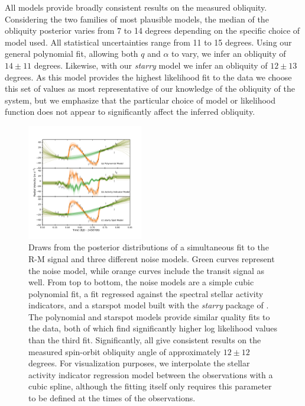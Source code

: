 \documentclass[twocolumn]{aastex63}
\begin{document}
All models provide broadly consistent results on the measured obliquity. Considering the two families of most plausible models, the median of the obliquity posterior varies from 7 to 14 degrees depending on the specific choice of model used.
All statistical uncertainties range from 11 to 15 degrees.
Using our general polynomial fit, allowing both $q$ and $\alpha$ to vary, we infer an obliquity of $14 \pm 11$ degrees.
Likewise, with our \textit{starry} model we infer an obliquity of $12 \pm 13$ degrees.
As this model provides the highest likelihood fit to the data we choose this set of values as most representative of our knowledge of the obliquity of the system, but we emphasize that the particular choice of model or likelihood function does not appear to significantly affect the inferred obliquity. 






\begin{figure}[!tbh]
  \begin{center}
    \includegraphics[width=0.45\textwidth, trim={0cm 0.0cm 1cm 1cm}, clip=true]{../figures/model_comp.pdf}
   \end{center}
  \caption{Draws from the posterior distributions of a simultaneous fit to the
  R-M signal and three different noise models. Green curves represent the noise model, while orange curves include the transit signal as well. From top to bottom, the noise models are a simple cubic polynomial fit, a fit regressed against the spectral stellar activity indicators, and a starspot model built with the \textit{starry} package of \citep{Luger19}. The polynomial and starspot models provide similar quality fits to the data, both of which find significantly higher log likelihood values than the third fit. Significantly, all give consistent results on the measured spin-orbit obliquity angle of approximately $12 \pm 12$ degrees. For visualization purposes, we interpolate the stellar activity indicator regression model between the observations with a cubic spline, although the fitting itself only requires this parameter to be defined at the times of the observations.}
  \label{fig:models}
\end{figure}
\end{document}
